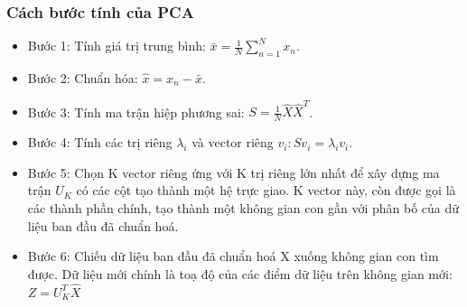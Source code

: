 \documentclass[a4paper, 12pt]{article}
\begin{document}
\subsubsection{Cách bước tính của PCA}
\begin{itemize}
    \item Bước 1: Tính giá trị trung bình: $\bar{x}=\frac{1}{N}\sum_{n=1}^{N}{x_n}$.
    \item Bước 2: Chuẩn hóa: $\hat{x} = x_n - \bar{x}$.
    \item Bước 3: Tính ma trận hiệp phương sai: $S = \frac{1}{N}\hat{X}\hat{X}^T$.
    \item Bước 4: Tính các trị riêng $\lambda_i$ và vector riêng $v_i: Sv_i=\lambda_iv_i$.
    \item Bước 5: Chọn K vector riêng ứng với K trị riêng lớn nhất để xây dựng ma trận $U_K$ có các cột tạo thành một hệ trực giao. K vector này, còn được gọi là các thành phần chính, tạo thành một không gian con gần với phân bố của dữ liệu ban đầu đã chuẩn hoá.
    \item Bước 6: Chiếu dữ liệu ban đầu đã chuẩn hoá X xuống không gian con tìm được. Dữ liệu mới chính là toạ độ của các điểm dữ liệu trên không gian mới: $Z=U_K^T \hat{X}$
\end{itemize}
\end{document}
